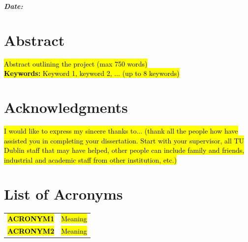 \documentclass[oneside,12pt]{book}
\begin{document}
\noindent
\textit{\textbf{Date:}}
\vspace{0.8cm}

\chapter*{Abstract}
\hl{Abstract outlining the project (max 750 words)
\\
\noindent
\textbf{Keywords:} \quad Keyword 1, keyword 2, ... (up to 8 keywords)}

\vfill

\chapter*{Acknowledgments}
\hl{I would like to express my sincere thanks to...
(thank all the people how have assisted you in completing your dissertation. Start with your supervisor, all TU Dublin staff that may have helped, other people can include family and friends, industrial and academic staff from other institution, etc.)}


\newpage
\tableofcontents

\listoffigures

\listoftables

\chapter*{List of Acronyms}
\begin{table}[H]
  \centering
    \begin{tabular}{ l l }
    
    \hl{\textbf{ACRONYM1}} & \hl{Meaning} \\
    \hl{\textbf{ACRONYM2}} & \hl{Meaning} \\ 
    \end{tabular}
\end{table}

\newpage

\fancyhead[RE,LO]{\leftmark}
\renewcommand{\headrulewidth}{2pt}



\end{document}

